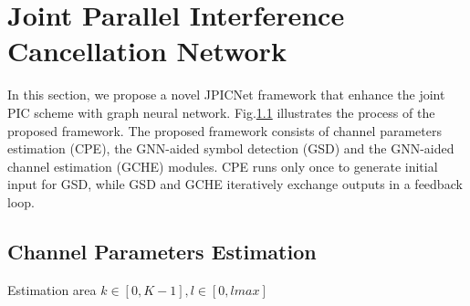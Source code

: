 \documentclass[journal]{IEEEtran}
\begin{document}


\section{Joint Parallel Interference Cancellation Network}

In this section, we propose a novel JPICNet framework that enhance the joint PIC scheme with graph neural network. Fig.\ref{} illustrates the process of the proposed framework. The proposed framework consists of channel parameters estimation (CPE), the GNN-aided symbol detection (GSD) and the GNN-aided channel estimation (GCHE) modules. CPE runs only once to generate initial input for GSD, while GSD and GCHE iteratively exchange outputs in a feedback loop.

\subsection{Channel Parameters Estimation}
Estimation area $k \in [0, K-1], l \in [0, lmax]$
\end{document}
